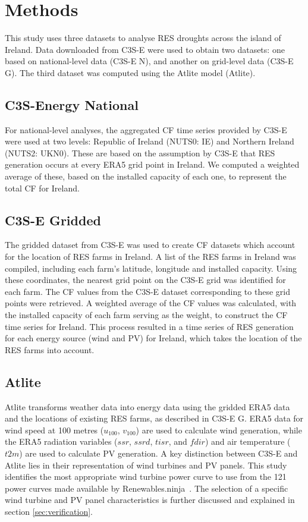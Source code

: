 \documentclass[preprint, 12pt, authoryear]{elsarticle}
\begin{document}
\section{Methods}
\label{sec:Methods}

This study uses three datasets to analyse RES droughts across the island of Ireland. Data downloaded from C3S-E were used to obtain two datasets: one based on national-level data (C3S-E N), and another on grid-level data (C3S-E G). The third dataset was computed using the Atlite model (Atlite).

\subsection{C3S-Energy National}
\label{sec:c3se_n}

For national-level analyses, the aggregated CF time series provided by C3S-E were used at two levels: Republic of Ireland (NUTS0: IE) and Northern Ireland (NUTS2: UKN0). These are based on the assumption by C3S-E that RES generation occurs at every ERA5 grid point in Ireland. We computed a weighted average of these, based on the installed capacity of each one, to represent the total CF for Ireland.

\subsection{C3S-E Gridded}
\label{sec:c3se_g}

The gridded dataset from C3S-E was used to create CF datasets which account for the location of RES farms in Ireland. A list of the RES farms in Ireland was compiled, including each farm’s latitude, longitude and installed capacity. Using these coordinates, the nearest grid point on the C3S-E grid was identified for each farm. The CF values from the C3S-E dataset corresponding to these grid points were retrieved. A weighted average of the CF values was calculated, with the installed capacity of each farm serving as the weight, to construct the CF time series for Ireland. This process resulted in a time series of RES generation for each energy source (wind and PV) for Ireland, which takes the location of the RES farms into account.

\subsection{Atlite} 
\label{sec:atlite}

Atlite transforms weather data into energy data using the gridded ERA5 data and the locations of existing RES farms, as described in C3S-E G. ERA5 data for wind speed at 100 metres ($u_{100}$, $v_{100}$) are used to calculate wind generation, while the ERA5 radiation variables ($ssr$, $ssrd$, $tisr$, and $fdir$) and air temperature ($t2m$) are used to calculate PV generation. A key distinction between C3S-E and Atlite lies in their representation of wind turbines and PV panels. This study identifies the most appropriate wind turbine power curve to use from the 121 power curves made available by Renewables.ninja~\citep{staffell2016wake}. The selection of a specific wind turbine and PV panel characteristics is further discussed and explained in section \ref{sec:verification}.
\end{document}
